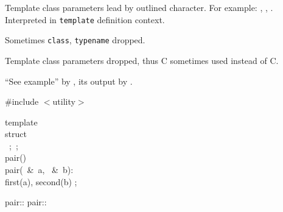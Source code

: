 \begin{multicols}{4}
\begin{list}{\mblt}{
    \setlength{\leftmargin}{12pt}
  }
 \item Template class parameters %
       lead by outlined character. For example:
        \T, \Key, \Compare. Interpreted 
        in \texttt{template} definition context.

 \item Sometimes \texttt{class}, \texttt{typename} dropped.

 \item Template class parameters dropped,\newline
        thus %
       \textsf{C} sometimes used instead of \textsf{C}\TPT.

 \item ``See example'' by \seeExample,
        its output by \symrunout.

\end{list}



 \label{Pair}

\#include $<$utility$>$

\begin{templdec}
template\\
struct  \lb\\
\phantom{ABC}\ ;\quad{}\ ;\\
\phantom{ABC}pair() \lb\rb\\
\phantom{ABC}pair(\const\ \&\ a, \const\ \&\ b):\\
\phantom{ABCpair}first(a), second(b) \lb\rb\quad\rb; \\
\end{templdec}



pair:: \newline
pair:: 

 \label{PairFunction}


\end{multicols}
